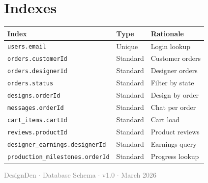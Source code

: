 \documentclass[a4paper,11pt]{article}
\begin{document}
\section{Indexes}

\begin{mdframed}[linecolor=primary!40, backgroundcolor=primary!4]
\begin{tabular}{@{}L{5cm}L{4cm}L{4cm}@{}}
\toprule
{}
\textbf{Index} & \textbf{Type} & \textbf{Rationale} \\
\midrule
\texttt{users.email}                        & Unique        & Login lookup \\
\texttt{orders.customerId}                  & Standard      & Customer orders \\
\texttt{orders.designerId}                  & Standard      & Designer orders \\
\texttt{orders.status}                      & Standard      & Filter by state \\
\texttt{designs.orderId}                    & Standard      & Design by order \\
\texttt{messages.orderId}                   & Standard      & Chat per order \\
\texttt{cart\_items.cartId}                 & Standard      & Cart load \\
\texttt{reviews.productId}                  & Standard      & Product reviews \\
\texttt{designer\_earnings.designerId}      & Standard      & Earnings query \\
\texttt{production\_milestones.orderId}     & Standard      & Progress lookup \\
\bottomrule
\end{tabular}
\end{mdframed}

\vfill
\begin{center}
  \small\textcolor{gray}{DesignDen $\cdot$ Database Schema $\cdot$ v1.0 $\cdot$ March 2026}
\end{center}
\end{document}

